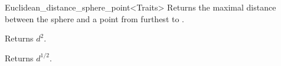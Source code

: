 \begin{ccRefClass}{Euclidean_distance_sphere_point<Traits>}
{Returns the maximal distance between the sphere  and
a point from  furthest to . }

 {Returns $d^2$.}

 {Returns $d^{1/2}$.}


\ccSeeAlso




\end{ccRefClass}


